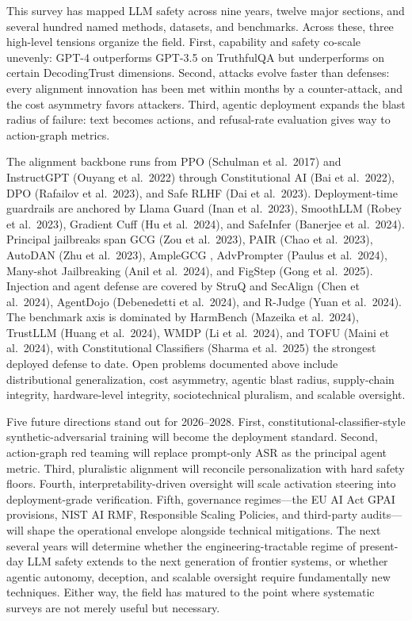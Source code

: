 \documentclass{article}
\begin{document}
This survey has mapped LLM safety across nine years, twelve major sections, and several hundred named methods, datasets, and benchmarks. Across these, three high-level tensions organize the field. First, capability and safety co-scale unevenly: GPT-4 outperforms GPT-3.5 on TruthfulQA but underperforms on certain DecodingTrust dimensions. Second, attacks evolve faster than defenses: every alignment innovation has been met within months by a counter-attack, and the cost asymmetry favors attackers. Third, agentic deployment expands the blast radius of failure: text becomes actions, and refusal-rate evaluation gives way to action-graph metrics.

The alignment backbone runs from PPO (Schulman et al.~2017) and InstructGPT (Ouyang et al.~2022) through Constitutional AI (Bai et al.~2022), DPO (Rafailov et al.~2023), and Safe RLHF (Dai et al.~2023). Deployment-time guardrails are anchored by Llama Guard (Inan et al.~2023), SmoothLLM (Robey et al.~2023), Gradient Cuff (Hu et al.~2024), and SafeInfer (Banerjee et al.~2024). Principal jailbreaks span GCG (Zou et al.~2023), PAIR (Chao et al.~2023), AutoDAN (Zhu et al.~2023), AmpleGCG \citep{liao2024arxiv2404079212024}, AdvPrompter (Paulus et al.~2024), Many-shot Jailbreaking (Anil et al.~2024), and FigStep (Gong et al.~2025). Injection and agent defense are covered by StruQ and SecAlign (Chen et al.~2024), AgentDojo (Debenedetti et al.~2024), and R-Judge (Yuan et al.~2024). The benchmark axis is dominated by HarmBench (Mazeika et al.~2024), TrustLLM (Huang et al.~2024), WMDP (Li et al.~2024), and TOFU (Maini et al.~2024), with Constitutional Classifiers (Sharma et al.~2025) the strongest deployed defense to date. Open problems documented above include distributional generalization, cost asymmetry, agentic blast radius, supply-chain integrity, hardware-level integrity, sociotechnical pluralism, and scalable oversight.

Five future directions stand out for 2026--2028. First, constitutional-classifier-style synthetic-adversarial training will become the deployment standard. Second, action-graph red teaming will replace prompt-only ASR as the principal agent metric. Third, pluralistic alignment will reconcile personalization with hard safety floors. Fourth, interpretability-driven oversight will scale activation steering into deployment-grade verification. Fifth, governance regimes---the EU AI Act GPAI provisions, NIST AI RMF, Responsible Scaling Policies, and third-party audits---will shape the operational envelope alongside technical mitigations. The next several years will determine whether the engineering-tractable regime of present-day LLM safety extends to the next generation of frontier systems, or whether agentic autonomy, deception, and scalable oversight require fundamentally new techniques. Either way, the field has matured to the point where systematic surveys are not merely useful but necessary.



\end{document}
